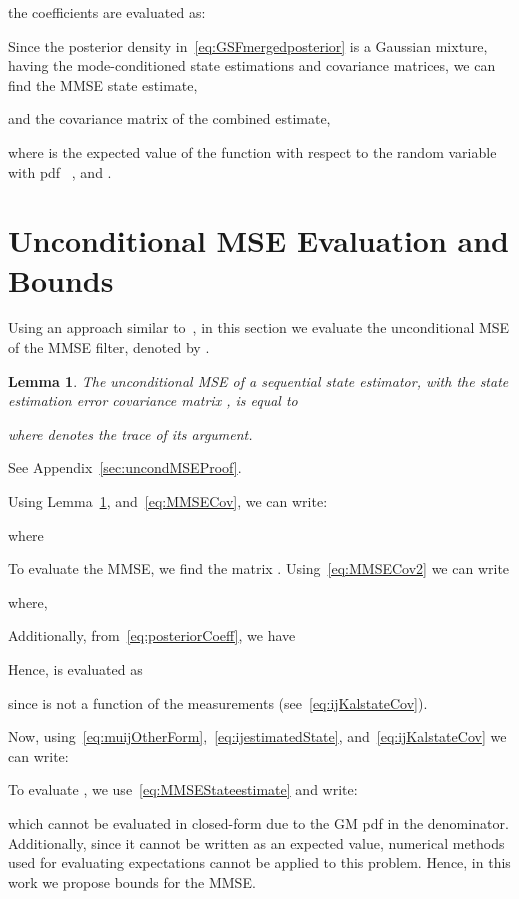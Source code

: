 \documentclass[10pt,twocolumn,twoside]{IEEEtran}
\newtheorem{lem}{Lemma}
\newcommand{\corcol}[1]{\textcolor{CorCol}{#1}}
\begin{document}
the coefficients  are evaluated as:



Since the posterior density in~\eqref{eq:GSFmergedposterior} is a Gaussian mixture, having the mode-conditioned state estimations and covariance matrices, we can find the MMSE state estimate, 

and the covariance matrix of the combined estimate,

where  is the expected value of the function  with respect to the random variable  with pdf ~\cite{bar2001estimation}\corcol{, and }. 
\section{Unconditional MSE Evaluation and Bounds}
\label{sec:ContributionMSE}
Using an approach similar to~\cite{flam_mmse_2012}, in this section we evaluate the unconditional MSE of the MMSE filter, denoted by .

\begin{lem}
\label{lemma:uncondMSE}
The unconditional MSE of a sequential state estimator, with the state estimation error covariance matrix , is equal to

where  denotes the trace of its argument.
\end{lem}
\begin{IEEEproof}
See Appendix~\ref{sec:uncondMSEProof}.
\end{IEEEproof}
Using Lemma~\ref{lemma:uncondMSE}, and~\eqref{eq:MMSECov}, we can write:

where
 
To evaluate the MMSE, we find the matrix . Using~\eqref{eq:MMSECov2} we can write

where,

Additionally, from~\eqref{eq:posteriorCoeff}, we have

Hence,  is evaluated as

since  is not a function of the measurements (see~\eqref{eq:ijKalstateCov}). 

Now, using~\eqref{eq:muijOtherForm},~\eqref{eq:ijestimatedState}, and~\eqref{eq:ijKalstateCov} we can write:


To evaluate , we use~\eqref{eq:MMSEStateestimate} and write:

which cannot be evaluated in closed-form due to the GM pdf in the denominator. Additionally, since it cannot be written as an expected value, numerical methods used for evaluating expectations cannot be applied to this problem. Hence, in this work we propose bounds for the MMSE. 
%
 
\end{document}
